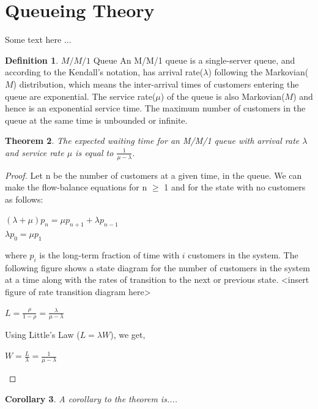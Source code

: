 \documentclass[12pt,a4paper]{report}
\theoremstyle{plain}
\newtheorem{theorem}{Theorem}[section]
\newtheorem{corollary}[theorem]{Corollary}
\theoremstyle{definition}
\newtheorem{definition}[theorem]{Definition}
\theoremstyle{remark}
\begin{document}
\section{Queueing Theory}

Some text here ...

\begin{definition}\label{abc1}
$M/M/1$ Queue
	An M/M/1 queue is a single-server queue, and according to the Kendall's notation, has arrival rate($\lambda$) following the Markovian($M$) distribution, which means the inter-arrival times of customers entering the queue are exponential. The service rate($\mu$) of the queue	is also Markovian($M$) and hence is an exponential service time. The maximum number of customers in the queue at the same time is unbounded or infinite.
\end{definition}
\vspace{2mm}
\begin{theorem}
The expected waiting time for an M/M/1 queue with arrival rate $\lambda$ and service rate $\mu$ is equal to $\frac{1}{\mu - \lambda}$.
\end{theorem}

\begin{proof}
Let n be the number of customers at a given time, in the queue. We can make the flow-balance equations for n $\ge$ 1 and for the state with no customers as follows:
\begin{center}
$(\lambda + \mu)p_n = \mu p_{n+1} + \lambda p_{n-1}$ \\
$\lambda p_0 = \mu p_1$ \\
\end{center}
where $p_i$ is the long-term fraction of time with $i$ customers in the system. The following figure shows a state diagram for the number of customers in the system at a time along with the rates of transition to the next or previous state.
<insert figure of rate transition diagram here>

\begin{center}
$L = \frac{\rho}{1-\rho} = \frac{\lambda}{\mu - \lambda}$
\end{center}
Using Little's Law ($L = \lambda W$), we get,
\begin{center}
	 $W = \frac{L}{\lambda} = \frac{1}{\mu - \lambda}$
\end{center}
\end{proof}
\vspace{20mm}

\begin{corollary}
A corollary to the theorem is....
\end{corollary}
\end{document}
